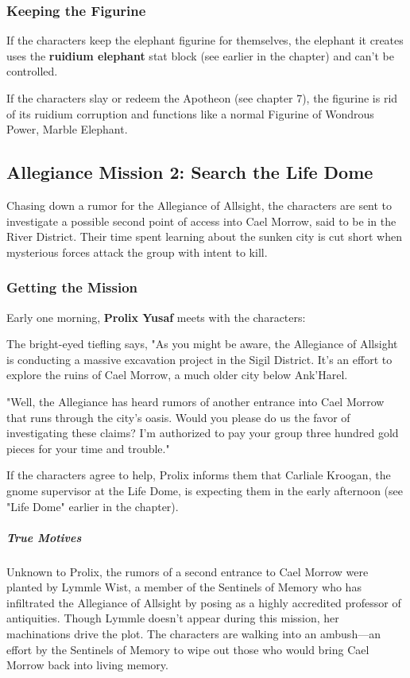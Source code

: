 \documentclass[10pt,a4paper,twoside,fancy,bg=print,twocolumn,openany,nodeprecatedcode]{dndbook}
\begin{document}
\subsubsection{Keeping the Figurine}
If the characters keep the elephant figurine for themselves, the elephant it creates uses the \textbf{ruidium elephant} stat block (see earlier in the chapter) and can't be controlled.

If the characters slay or redeem the Apotheon (see chapter 7), the figurine is rid of its ruidium corruption and functions like a normal Figurine of Wondrous Power, Marble Elephant.

\subsection{Allegiance Mission 2: Search the Life Dome}
Chasing down a rumor for the Allegiance of Allsight, the characters are sent to investigate a possible second point of access into Cael Morrow, said to be in the River District. Their time spent learning about the sunken city is cut short when mysterious forces attack the group with intent to kill.

\subsubsection{Getting the Mission}
Early one morning, \textbf{Prolix Yusaf} meets with the characters:

\begin{DndReadAloud}{}
The bright-eyed tiefling says, "As you might be aware, the Allegiance of Allsight is conducting a massive excavation project in the Sigil District. It's an effort to explore the ruins of Cael Morrow, a much older city below Ank'Harel.

"Well, the Allegiance has heard rumors of another entrance into Cael Morrow that runs through the city's oasis. Would you please do us the favor of investigating these claims? I'm authorized to pay your group three hundred gold pieces for your time and trouble."

\end{DndReadAloud}

If the characters agree to help, Prolix informs them that Carliale Kroogan, the gnome supervisor at the Life Dome, is expecting them in the early afternoon (see "Life Dome" earlier in the chapter).

\subparagraph{True Motives}
Unknown to Prolix, the rumors of a second entrance to Cael Morrow were planted by Lymmle Wist, a member of the Sentinels of Memory who has infiltrated the Allegiance of Allsight by posing as a highly accredited professor of antiquities. Though Lymmle doesn't appear during this mission, her machinations drive the plot. The characters are walking into an ambush—an effort by the Sentinels of Memory to wipe out those who would bring Cael Morrow back into living memory.
\end{document}
